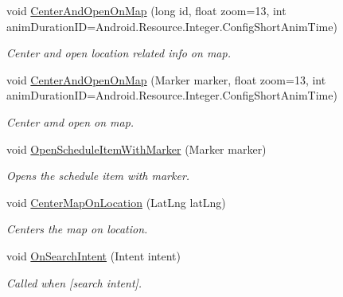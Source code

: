 \begin{DoxyCompactItemize}
void \hyperlink{class_w_c_c_mobile_1_1_campus_map_fragment_aa223f27f3e33ce306c48f1b046aadee3}{Center\+And\+Open\+On\+Map} (long id, float zoom=13, int anim\+Duration\+ID=Android.\+Resource.\+Integer.\+Config\+Short\+Anim\+Time)
\begin{DoxyCompactList}\small\item\em Center and open location related info on map. \end{DoxyCompactList}\item 
void \hyperlink{class_w_c_c_mobile_1_1_campus_map_fragment_a8e29f0c6d1e38218da346928adbcc219}{Center\+And\+Open\+On\+Map} (Marker marker, float zoom=13, int anim\+Duration\+ID=Android.\+Resource.\+Integer.\+Config\+Short\+Anim\+Time)
\begin{DoxyCompactList}\small\item\em Center amd open on map. \end{DoxyCompactList}\item 
void \hyperlink{class_w_c_c_mobile_1_1_campus_map_fragment_a84edd9783492a39586240f3280be9112}{Open\+Schedule\+Item\+With\+Marker} (Marker marker)
\begin{DoxyCompactList}\small\item\em Opens the schedule item with marker. \end{DoxyCompactList}\item 
void \hyperlink{class_w_c_c_mobile_1_1_campus_map_fragment_aa93bb230cabe12b3a941dc70dbeeb8c4}{Center\+Map\+On\+Location} (Lat\+Lng lat\+Lng)
\begin{DoxyCompactList}\small\item\em Centers the map on location. \end{DoxyCompactList}\item 
void \hyperlink{class_w_c_c_mobile_1_1_campus_map_fragment_aa2c1d521ebaee9cd15e437e84466a791}{On\+Search\+Intent} (Intent intent)
\begin{DoxyCompactList}\small\item\em Called when \mbox{[}search intent\mbox{]}. \end{DoxyCompactList}\end{DoxyCompactItemize}
